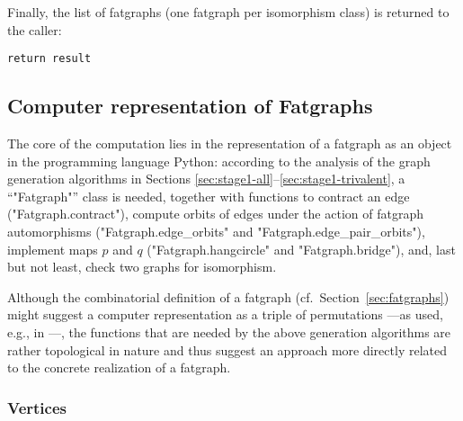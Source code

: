 Finally, the list of fatgraphs (one fatgraph per isomorphism class) is
returned to the caller:
\begin{lstlisting}[name=MgnTrivalentGraphs,firstnumber=50]
    return result
\end{lstlisting}


\subsection{Computer representation of Fatgraphs}
\label{sec:stage1-fatgraphs}

The core of the computation lies in the representation of a fatgraph
as an object in the programming language Python: according to the
analysis of the graph generation algorithms in
Sections \ref{sec:stage1-all}--\ref{sec:stage1-trivalent}, a
``"Fatgraph"'' class is needed, together with functions to contract an
edge ("Fatgraph.contract"), compute orbits of edges under the action
of fatgraph automorphisms ("Fatgraph.edge_orbits" and
"Fatgraph.edge_pair_orbits"), implement maps $p$ and $q$
("Fatgraph.hangcircle" and "Fatgraph.bridge"), and, last but not
least, check two graphs for isomorphism.

Although the combinatorial definition of a fatgraph
(cf.~Section~\ref{sec:fatgraphs}) might suggest a computer representation as
a triple of permutations ---as used, e.g., in \cite[Section
2.4]{arXiv:0902.1025}---, the functions that are needed by the above
generation algorithms are rather topological in nature and thus
suggest an approach more directly related to the concrete realization
of a fatgraph.

\subsubsection{Vertices}
\label{sec:vertices}

